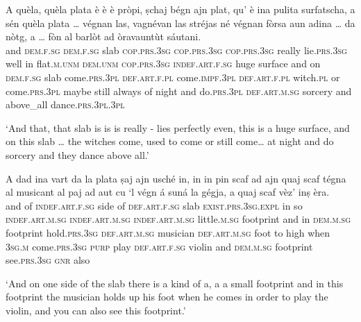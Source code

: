 \begin{linenumbers}
\gll    A quèla, quèla plata è è è pròpi, ṣchaj bégn ajn plat, qu’ è ina pulita surfatscha, a sén quèla plata … végnan las, vagnévan las stréjas né végnan fòrsa aun adina … da nòtg, a … fòn al barlòt ad òravauntùt sáutani.\\
and \textsc{dem.f.sg} \textsc{dem.f.sg} slab \textsc{cop.prs.3sg} \textsc{cop.prs.3sg} \textsc{cop.prs.3sg} really lie.\textsc{prs.3sg} well in flat.\textsc{m.unm} \textsc{dem.unm} \textsc{cop.prs.3sg} \textsc{indef.art.f.sg} huge surface and on \textsc{dem.f.sg} slab {} come.\textsc{prs.3pl}  \textsc{def.art.f.pl} come.\textsc{impf.3pl} \textsc{def.art.f.pl} witch.\textsc{pl} or come.\textsc{prs.3pl} maybe still always {} of night and {} do.\textsc{prs.3pl} \textsc{def.art.m.sg} sorcery and above\_all dance.\textsc{prs.3pl.3pl}\\
\end{linenumbers}
\medskip
\glt `And that, that slab is is is really - lies perfectly even, this is a huge surface, and on this slab … the witches come, used to come or still come… at night and do sorcery and they dance above all.'
\medskip

\begin{linenumbers}
	\gll A dad ina vart da la plata ṣaj ajn usché in, in in pin scaf ad ajn quaj scaf tégna\footnotemark{} al musicant al paj ad aut cu `l végn á suná la gégja, a quaj scaf vèz’ inṣ èra.\\
and of \textsc{indef.art.f.sg} side of \textsc{def.art.f.sg} slab \textsc{exist.prs.3sg.expl} in so \textsc{indef.art.m.sg} \textsc{indef.art.m.sg} \textsc{indef.art.m.sg} little.\textsc{m.sg} footprint and in \textsc{dem.m.sg} footprint hold.\textsc{prs.3sg} \textsc{def.art.m.sg} musician \textsc{def.art.m.sg} foot to high when \textsc{3sg.m} come.\textsc{prs.3sg} \textsc{purp} play \textsc{def.art.f.sg} violin and \textsc{dem.m.sg} footprint see.\textsc{prs.3sg} \textsc{gnr} also\\
\end{linenumbers}
\medskip
\glt `And on one side of the slab there is a kind of a, a a small footprint and in this footprint the musician holds up his foot when he comes in order to play the violin, and you can also see this footprint.'
\medskip

